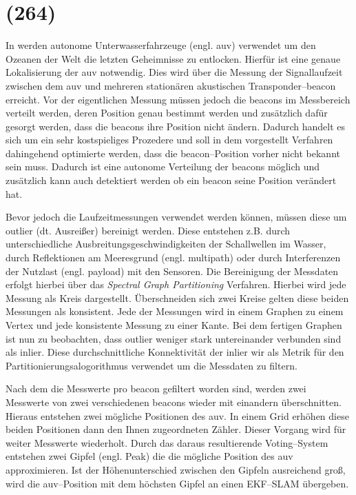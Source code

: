 \section{(264)}

In \cite{olson2004robust} werden autonome Unterwasserfahrzeuge (engl. \gls{auv}) verwendet um den Ozeanen der Welt die letzten Geheimnisse zu entlocken. Hierfür ist eine genaue Lokalisierung der \gls{auv} notwendig. Dies wird über die Messung der Signallaufzeit zwischen dem \gls{auv} und mehreren stationären akustischen Transponder--\Gls{beacon} erreicht. Vor der eigentlichen Messung müssen jedoch die \Glspl{beacon} im Messbereich verteilt werden, deren Position genau bestimmt werden und zusätzlich dafür gesorgt werden, dass die \Glspl{beacon} ihre Position nicht ändern. Dadurch handelt es sich um ein sehr kostspieliges Prozedere und soll in dem vorgestellt Verfahren dahingehend optimierte werden, dass die \Gls{beacon}--Position vorher nicht bekannt sein muss. Dadurch ist eine autonome Verteilung der \Glspl{beacon} möglich und zusätzlich kann auch detektiert werden ob ein \Gls{beacon} seine Position verändert hat.

Bevor jedoch die Laufzeitmessungen verwendet werden können, müssen diese um \Gls{outlier} (dt. Ausreißer) bereinigt werden. Diese entstehen z.B. durch unterschiedliche Ausbreitungsgeschwindigkeiten der Schallwellen im Wasser, durch Reflektionen am Meeresgrund (engl. \Gls{multipath}) oder durch Interferenzen der Nutzlast (engl. \Gls{payload}) mit den Sensoren. Die Bereinigung der Messdaten erfolgt hierbei über das \textit{Spectral Graph Partitioning} Verfahren. Hierbei wird jede Messung als Kreis dargestellt. Überschneiden sich zwei Kreise gelten diese beiden Messungen als konsistent. Jede der Messungen wird in einem Graphen zu einem Vertex und jede konsistente Messung zu einer Kante. Bei dem fertigen Graphen ist nun zu beobachten, dass \Gls{outlier} weniger stark untereinander verbunden sind als \Gls{inlier}. Diese durchschnittliche Konnektivität der \Gls{inlier} wir als Metrik für den Partitionierungsalogorithmus verwendet um die Messdaten zu filtern.

Nach dem die Messwerte pro \Gls{beacon} gefiltert worden sind, werden zwei Messwerte von zwei verschiedenen \Glspl{beacon} wieder mit einandern überschnitten. Hieraus entstehen zwei mögliche Positionen des \gls{auv}. In einem Grid erhöhen diese beiden Positionen dann den Ihnen zugeordneten Zähler. Dieser Vorgang wird für weiter Messwerte wiederholt. Durch das daraus resultierende Voting--System entstehen zwei Gipfel (engl. Peak) die die mögliche Position des \gls{auv} approximieren. Ist der Höhenunterschied zwischen den Gipfeln ausreichend groß, wird die \gls{auv}--Position mit dem höchsten Gipfel an einen EKF--SLAM übergeben.


